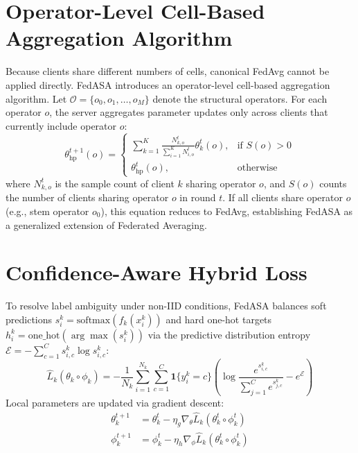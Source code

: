 \documentclass[12pt,a4paper]{report}
\begin{document}
\section{Operator-Level Cell-Based Aggregation Algorithm}
Because clients share different numbers of cells, canonical FedAvg cannot be applied directly. FedASA introduces an operator-level cell-based aggregation algorithm. Let $\mathcal{O} = \{o_0, o_1, \dots, o_M\}$ denote the structural operators. For each operator $o$, the server aggregates parameter updates only across clients that currently include operator $o$:
\begin{equation}
    \theta_{\text{hp}}^{t+1}(o) = \begin{cases}
        \sum_{k=1}^K \frac{N_{k,o}^t}{\sum_{i=1}^K N_{i,o}^t} \theta_k^t(o), & \text{if } S(o) > 0 \\
        \theta_{\text{hp}}^t(o), & \text{otherwise}
    \end{cases}
\end{equation}
where $N_{k,o}^t$ is the sample count of client $k$ sharing operator $o$, and $S(o)$ counts the number of clients sharing operator $o$ in round $t$. If all clients share operator $o$ (e.g., stem operator $o_0$), this equation reduces to FedAvg, establishing FedASA as a generalized extension of Federated Averaging.

\section{Confidence-Aware Hybrid Loss}
To resolve label ambiguity under non-IID conditions, FedASA balances soft predictions $s_i^k = \mathrm{softmax}(f_k(x_i^k))$ and hard one-hot targets $h_i^k = \mathrm{one\_hot}(\arg\max(s_i^k))$ via the predictive distribution entropy $\mathcal{E} = -\sum_{c=1}^C s_{i,c}^k \log s_{i,c}^k$:
\begin{equation}
    \hat{L}_k(\theta_k \circ \phi_k) = -\frac{1}{N_k} \sum_{i=1}^{N_k} \sum_{c=1}^C \mathbf{1}\{y_i^k = c\} \left( \log \frac{e^{s_{i,c}^k}}{\sum_{j=1}^C e^{s_{j,c}^k}} - e^{\mathcal{E}} \right)
\end{equation}
Local parameters are updated via gradient descent:
\begin{align}
    \theta_k^{t+1} &= \theta_k^t - \eta_g \nabla_{\theta} \hat{L}_k(\theta_k^t \circ \phi_k^t) \\
    \phi_k^{t+1} &= \phi_k^t - \eta_h \nabla_{\phi} \hat{L}_k(\theta_k^t \circ \phi_k^t)
\end{align}
\end{document}
